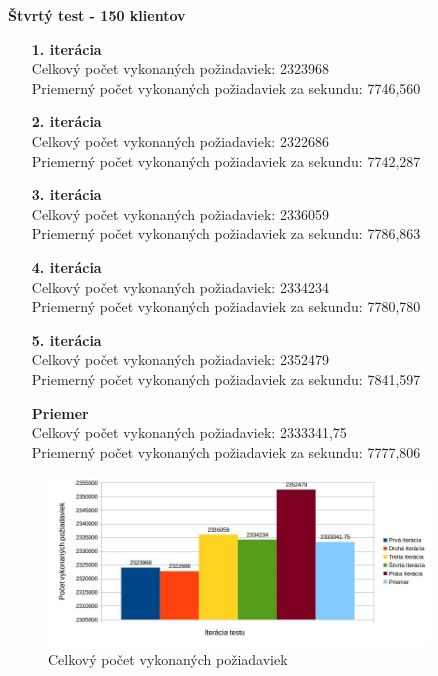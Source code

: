 \documentclass[12pt,oneside,final]{fithesis-utf8}
\begin{document}
\begin{itemize}
\textbf{Štvrtý test - 150 klientov}
\begin{itemize}

\item[\textbf{1. iterácia}]\ \\
Celkový počet vykonaných požiadaviek: 2323968\\
Priemerný počet vykonaných požiadaviek za sekundu: 7746,560

\item[\textbf{2. iterácia}]\ \\
Celkový počet vykonaných požiadaviek: 2322686\\
Priemerný počet vykonaných požiadaviek za sekundu: 7742,287

\item[\textbf{3. iterácia}]\ \\
Celkový počet vykonaných požiadaviek: 2336059\\
Priemerný počet vykonaných požiadaviek za sekundu: 7786,863

\item[\textbf{4. iterácia}]\ \\
Celkový počet vykonaných požiadaviek: 2334234\\
Priemerný počet vykonaných požiadaviek za sekundu: 7780,780

\item[\textbf{5. iterácia}]\ \\
Celkový počet vykonaných požiadaviek: 2352479\\
Priemerný počet vykonaných požiadaviek za sekundu: 7841,597

\item[\textbf{Priemer}]\ \\
Celkový počet vykonaných požiadaviek: 2333341,75\\
Priemerný počet vykonaných požiadaviek za sekundu: 7777,806

\end{itemize}

\begin{figure}[H]
  \centering
      \includegraphics[width=0.9\textwidth]{gatling2_4.jpg}
  \caption{Celkový počet vykonaných požiadaviek}
\end{figure}


\end{itemize}
\end{document}
